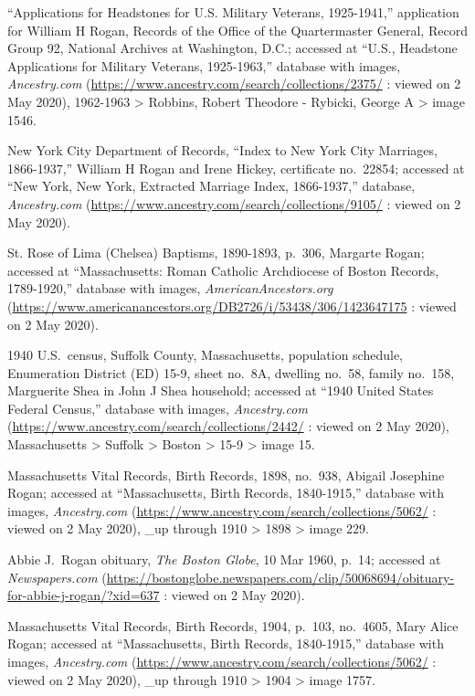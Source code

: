 \begin{thebibliography}{999}
	``Applications for Headstones for U.S. Military Veterans, 1925-1941,'' application for William H Rogan, Records of the Office of the Quartermaster General, Record Group 92, National Archives at Washington, D.C.; accessed at ``U.S., Headstone Applications for Military Veterans, 1925-1963,'' database with images, \textit{Ancestry.com} (\url{https://www.ancestry.com/search/collections/2375/} : viewed on 2 May 2020), 1962-1963 > Robbins, Robert Theodore - Rybicki, George A > image 1546.
	
	New York City Department of Records, ``Index to New York City Marriages, 1866-1937,'' William H Rogan and Irene Hickey, certificate no.\ 22854; accessed at ``New York, New York, Extracted Marriage Index, 1866-1937,'' database, \textit{Ancestry.com} (\url{https://www.ancestry.com/search/collections/9105/} : viewed on 2 May 2020).
	
	St. Rose of Lima (Chelsea) Baptisms, 1890-1893, p.\ 306, Margarte Rogan; accessed at ``Massachusetts: Roman Catholic Archdiocese of Boston Records, 1789-1920,'' database with images, \textit{AmericanAncestors.org} (\url{https://www.americanancestors.org/DB2726/i/53438/306/1423647175} : viewed on 2 May 2020).
	
	1940 U.S.\ census, Suffolk County, Massachusetts, population schedule, Enumeration District (ED) 15-9, sheet no.\ 8A, dwelling no.\ 58, family no.\ 158, Marguerite Shea in John J Shea household; accessed at ``1940 United States Federal Census,'' database with images, \textit{Ancestry.com} (\url{https://www.ancestry.com/search/collections/2442/} : viewed on 2 May 2020), Massachusetts > Suffolk > Boston > 15-9 > image 15.
	
	Massachusetts Vital Records, Birth Records, 1898, no.\ 938, Abigail Josephine Rogan; accessed at ``Massachusetts, Birth Records, 1840-1915,'' database with images, \textit{Ancestry.com} (\url{https://www.ancestry.com/search/collections/5062/} : viewed on 2 May 2020), \_up through 1910 > 1898 > image 229.
	
	Abbie J.\ Rogan obituary, \textit{The Boston Globe}, 10 Mar 1960, p.\ 14; accessed at \textit{Newspapers.com} (\url{https://bostonglobe.newspapers.com/clip/50068694/obituary-for-abbie-j-rogan/?xid=637} : viewed on 2 May 2020).
	
	Massachusetts Vital Records, Birth Records, 1904, p.\ 103, no.\ 4605, Mary Alice Rogan; accessed at ``Massachusetts, Birth Records, 1840-1915,'' database with images, \textit{Ancestry.com} (\url{https://www.ancestry.com/search/collections/5062/} : viewed on 2 May 2020), \_up through 1910 > 1904 > image 1757.
	

\end{thebibliography}
